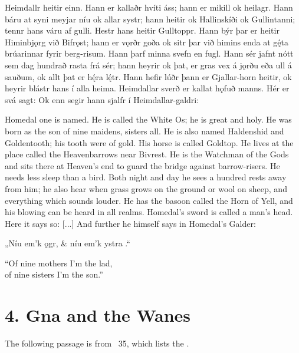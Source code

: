 \sectionline

\bpg\bpa[0]%
Heimdallr heitir einn. Hann er kallaðr hvíti áss; hann er mikill ok heilagr. Hann báru at syni meyjar níu ok allar systr; hann heitir ok Hallinskíði ok Gullintanni; tennr hans váru af gulli. Hestr hans heitir Gulltoppr. Hann býr þar er heitir Himinbjǫrg við Bifrǫst; hann er vǫrðr goða ok sitr þar við himins enda at gę́ta brúarinnar fyrir berg-risum. Hann þarf minna svefn en fugl. Hann sér jafnt nótt sem dag hundrað rasta frá sér; hann heyrir ok þat, er gras vex á jǫrðu eða ull á sauðum, ok allt þat er hę́ra lę́tr. Hann hefir lúðr þann er Gjallar-horn heitir, ok heyrir blástr hans í alla heima. Heimdallar sverð er kallat hǫfuð manns. Hér er svá sagt:  Ok enn segir hann sjalfr í Heimdallar-galdri:\epa

\bpb Homedal one is named.  He is called the White Os; he is great and holy.  He was born as the son of nine maidens, sisters all.  He is also named Haldenshid and Goldentooth; his tooth were of gold.  His horse is called Goldtop.  He lives at the place called the Heavenbarrows near Bivrest.  He is the Watchman of the Gods and sits there at Heaven’s end to guard the bridge against barrow-risers.  He needs less sleep than a bird.  Both night and day he sees a hundred rests away from him; he also hear when grass grows on the ground or wool on sheep, and everything which sounds louder. He has the basoon called the Horn of Yell, and his blowing can be heard in all realms.  Homedal’s sword is called a man’s head.  Here it says so: [...] And further he himself says in Homedal’s Galder:\epb\epg


\bvg\bva[][12]%
„Níu em’k  ǫgr, &
níu em’k ystra .“\eva

\bvb “Of nine mothers I’m the lad, \\
of nine sisters I’m the son.”\evb\evg

\sectionline

\section{4. Gna and the Wanes}

The following passage is from \Gylfaginning\ 35, which lists the .

\sectionline

